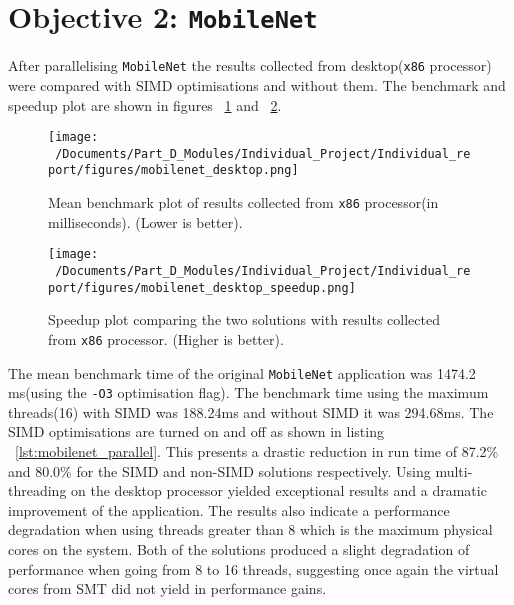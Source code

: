 \section{Objective 2: \texttt{MobileNet}}
After parallelising \texttt{MobileNet} the results collected from desktop(\texttt{x86} processor) were compared with SIMD optimisations and without them. The benchmark and speedup plot are shown in figures ~\ref{fig:mobilenet_desktop_plot} and ~\ref{fig:mobilenet_desktop_speedup}. 

\begin{figure}[htbp] %
	\centering
	\texttt{[image: ~/Documents/Part\_D\_Modules/Individual\_Project/Individual\_report/figures/mobilenet\_desktop.png]} %
	\caption{Mean benchmark plot of results collected from \texttt{x86} processor(in milliseconds). (Lower is better).}
	\label{fig:mobilenet_desktop_plot} %
\end{figure}

\begin{figure}[htbp] %
	\centering
	\texttt{[image: ~/Documents/Part\_D\_Modules/Individual\_Project/Individual\_report/figures/mobilenet\_desktop\_speedup.png]} %
	\caption{Speedup plot comparing the two solutions with results collected from \texttt{x86} processor. (Higher is better).}
	\label{fig:mobilenet_desktop_speedup} %
\end{figure}

The mean benchmark time of the original \texttt{MobileNet} application\cite{mobilenet_repo} was 1474.2 ms(using the \texttt{-O3} optimisation flag). The benchmark time using the maximum threads(16) with SIMD was 188.24ms and without SIMD it was 294.68ms. The SIMD optimisations are turned on and off as shown in listing  ~\ref{lst:mobilenet_parallel}. This presents a drastic reduction in run time of 87.2\% and 80.0\% for the SIMD and non-SIMD solutions respectively. Using multi-threading on the desktop processor yielded exceptional results and a dramatic improvement of the application. The results also indicate a performance degradation when using threads greater than 8 which is the maximum physical cores on the system. Both of the solutions produced a slight degradation of performance when going from 8 to 16 threads, suggesting once again the virtual cores from SMT did not yield in performance gains. 

